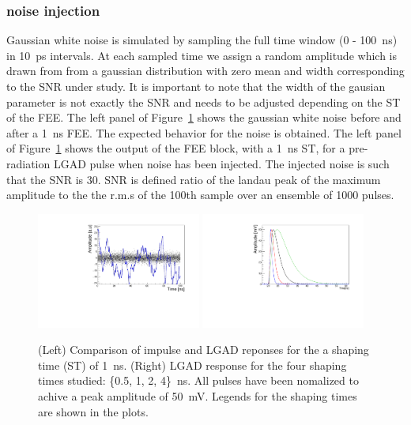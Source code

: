 \documentclass[preprint,1p]{elsarticle}
\begin{document}
\subsubsection{noise injection}\label{sec:noise_simulation}
Gaussian white noise is simulated by sampling the full time window (0 - 100~\si{ns}) in 10~\si{ps} intervals. At each
sampled time we assign a random amplitude which is drawn from from a gaussian distribution with zero mean and width corresponding to the SNR
under study. It is important to note that the width of the gausian parameter is not exactly the SNR and needs to be adjusted depending
on the ST of the FEE. The left panel of Figure~\ref{fig:noise} shows the gaussian white noise before and after a 1~\si{ns} FEE.
The expected behavior for the noise is obtained. The left panel of Figure~\ref{fig:noise} shows the output of the FEE block, with a 1~\si{ns} ST,
 for a pre-radiation LGAD pulse when noise has been injected. The injected noise is such that the SNR is 30. SNR is defined ratio of the landau peak of the maximum amplitude
 to the the r.m.s of the 100th sample over  an ensemble of 1000 pulses.

\begin{figure}[htbp]
  \centering
  \includegraphics[width=0.48\textwidth]{figs/noise_vs_shaped_noise.pdf} \hfill
  \includegraphics[width=0.48\textwidth]{figs/lgad_all_shaping_time_noiseless.pdf}
  \caption{(Left) Comparison of impulse and LGAD reponses for the a shaping time (ST) of 1~\si{ns}.
  (Right) LGAD response for the four shaping times studied: \{0.5, 1, 2, 4\}~\si{ns}. All pulses have been nomalized
  to achive a peak amplitude of 50~\si{mV}. Legends for the shaping times are shown in the plots.}
  \label{fig:noise}
\end{figure}
\end{document}
